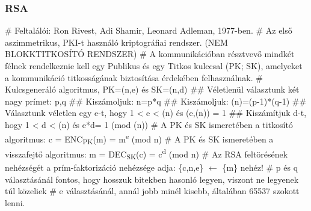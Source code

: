 \subsubsection{RSA}
\begin{easylist}[itemize]
# Feltalálói: Ron Rivest, Adi Shamir, Leonard Adleman, 1977-ben.
# Az első aszimmetrikus, PKI-t használó kriptográfiai rendszer. (NEM BLOKKTITKOSÍTÓ RENDSZER)
# A kommunikációban résztvevő mindkét félnek rendelkeznie kell egy Publikus és egy Titkos kulccsal (PK; SK), amelyeket a kommunikáció titkosságának biztosítása érdekében felhasználnak.
# Kulcsgeneráló algoritmus, PK=(n,e) és SK=(n,d)
## Véletlenül választunk két nagy prímet: p,q
## Kiszámoljuk: n=p*q
## Kiszámoljuk: \textphi(n)=(p-1)*(q-1)
## Választunk véletlen egy e-t, hogy 1 < e < \textphi(n) és (e,\textphi(n)) = 1
## Kiszámítjuk d-t, hogy 1 < d < \textphi(n) és e*d= 1 (mod \textphi(n))
# A PK és SK ismeretében a titkosító algoritmus: 	c = ENC\textsubscript{PK}(m) = m\textsuperscript{e} (mod n)
# A PK és SK ismeretében a visszafejtő algoritmus: 	m = DEC\textsubscript{SK}(c) = c\textsuperscript{d} (mod n)
# Az RSA feltörésének nehézségét a prím-faktorizáció nehézsége adja:  \{c,n,e\} $\leftarrow$ \{m\}  nehéz!
# p és q választásánál fontos, hogy hosszuk bitekben hasonló legyen, viszont ne legyenek túl közeliek
# e választásánál, annál jobb minél kisebb, általában 65537 szokott lenni.
\end{easylist}

